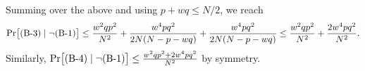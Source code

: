 Summing over the above and using $p+wq\leq N/2$, we reach
%
$${\Pr}\big[\text{(B-3)}\mid\neg\text{(B-1)}\big]\leq
\frac{w^2qp^2}{N^2}+\frac{w^4pq^2}{2N(N-p-wq)}+
\frac{w^4pq^2}{2N(N-p-wq)}\leq\frac{w^2qp^2}{N^2}+\frac{2w^4pq^2}{N^2}.$$
%
Similarly, ${\Pr}\big[\text{(B-4)}\mid\neg\text{(B-1)}\big] \leq
\frac{w^2qp^2+2w^4pq^2}{N^2}$ by symmetry.



%
%
%
%
%
%
%
%



%
%
%


